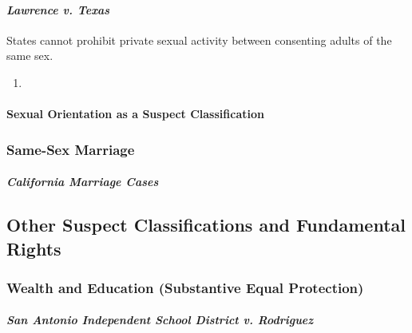 \paragraph{\emph{Lawrence v. Texas}}

States cannot prohibit private sexual activity between consenting adults of 
the same sex.

\begin{enumerate}
    \item %
\end{enumerate}
 
\paragraph{Sexual Orientation as a Suspect Classification}
 
 
\subsubsection{Same-Sex Marriage}

\paragraph{\emph{California Marriage Cases}}

 
\subsection{Other Suspect Classifications and Fundamental Rights}
 
\subsubsection{Wealth and Education (Substantive Equal Protection)}

\paragraph{\emph{San Antonio Independent School District v. Rodriguez}}

